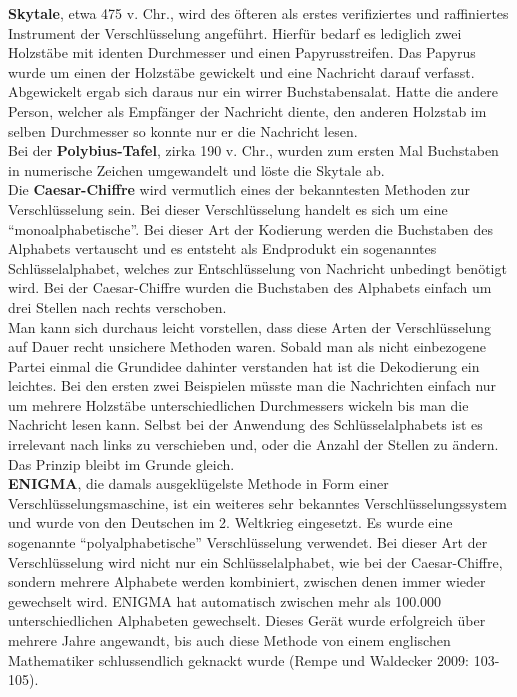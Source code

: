 \documentclass[german,12pt,a4paper]{article}
\begin{document}
\textbf{Skytale}, etwa 475 v. Chr., wird des öfteren als erstes verifiziertes und raffiniertes Instrument der Verschlüsselung angeführt. Hierfür bedarf es lediglich zwei  Holzstäbe mit identen Durchmesser und einen Papyrusstreifen. Das Papyrus wurde um einen der Holzstäbe gewickelt und eine Nachricht darauf verfasst. Abgewickelt ergab sich daraus nur ein wirrer Buchstabensalat. Hatte die andere Person, welcher als Empfänger der Nachricht diente, den anderen Holzstab im selben Durchmesser so konnte nur er die Nachricht lesen.\\

Bei der \textbf{Polybius-Tafel}, zirka 190 v. Chr., wurden zum ersten Mal Buchstaben in numerische Zeichen umgewandelt und löste die Skytale ab.\\

Die \textbf{Caesar-Chiffre} wird vermutlich eines der bekanntesten Methoden zur Verschlüsselung sein. Bei dieser Verschlüsselung handelt es sich um eine “monoalphabetische”. Bei dieser Art der Kodierung werden die Buchstaben des Alphabets vertauscht und es entsteht als Endprodukt ein sogenanntes Schlüsselalphabet, welches zur Entschlüsselung von Nachricht unbedingt benötigt wird. Bei der Caesar-Chiffre wurden die Buchstaben des Alphabets einfach um drei Stellen nach rechts verschoben.\\
Man kann sich durchaus leicht vorstellen, dass diese Arten der Verschlüsselung auf Dauer recht unsichere Methoden waren. Sobald man als nicht einbezogene Partei einmal die Grundidee dahinter verstanden hat ist die Dekodierung ein leichtes. Bei den ersten zwei Beispielen müsste man die Nachrichten einfach nur um mehrere Holzstäbe unterschiedlichen Durchmessers wickeln bis man die Nachricht lesen kann. Selbst bei der Anwendung des Schlüsselalphabets ist es irrelevant nach links zu verschieben und, oder die Anzahl der Stellen zu ändern. Das Prinzip bleibt im Grunde gleich.\\

\textbf{ENIGMA}, die damals ausgeklügelste Methode in Form einer Verschlüsselungsmaschine, ist ein weiteres sehr bekanntes Verschlüsselungssystem und wurde von den Deutschen im 2. Weltkrieg eingesetzt. Es wurde eine sogenannte “polyalphabetische” Verschlüsselung verwendet. Bei dieser Art der Verschlüsselung wird nicht nur ein Schlüsselalphabet, wie bei der Caesar-Chiffre, sondern mehrere Alphabete werden kombiniert, zwischen denen immer wieder gewechselt wird. ENIGMA hat automatisch zwischen mehr als 100.000 unterschiedlichen Alphabeten gewechselt. Dieses Gerät wurde erfolgreich über mehrere Jahre angewandt, bis auch diese Methode von einem englischen Mathematiker schlussendlich geknackt wurde (Rempe und Waldecker 2009: 103-105).
\end{document}
